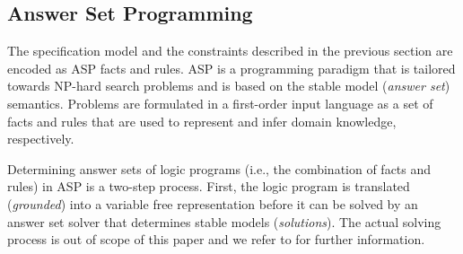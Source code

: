 \subsection{Answer Set Programming}
The specification model and the constraints described in the previous section are encoded as \acf{ASP} facts and rules. \ac{ASP} is 
a programming paradigm that is tailored towards NP-hard search problems and is based on the stable model (\emph{answer set}) 
semantics. Problems are formulated in a first-order input language as a set of facts and rules that are used to represent and infer 
domain knowledge, respectively. %

Determining answer sets of logic programs (i.e., the combination of facts and rules) in \ac{ASP} is a two-step process. First, the
logic program is translated (\emph{grounded}) into a variable free representation before it can be solved by an answer set solver 
that determines stable models (\emph{solutions}). 
The actual solving process is out of scope of this paper and we refer to \cite{gekakarosc15a} for further information.\par 

